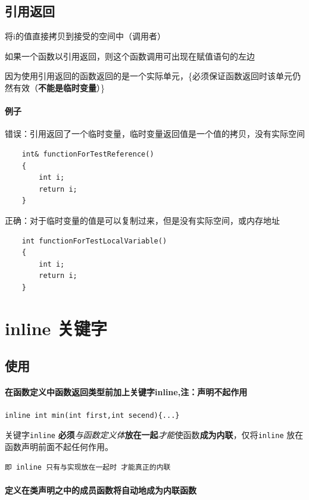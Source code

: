 \documentclass[UTF8,a4paper,12pt]{ctexbook} %
\begin{document}
 	\section{引用返回}将i的值直接拷贝到接受的空间中（调用者）    
 		
	 		如果一个函数以引用返回，则这个函数调用可出现在赋值语句的左边
	 		
	 		因为使用引用返回的函数返回的是一个实际单元，\{必须保证函数返回时该单元仍然有效（\textbf{不能是临时变量}）\}
 		
 		\subsubsection{例子}
 		
	 		错误：引用返回了一个临时变量，临时变量返回值是一个值的拷贝，没有实际空间
	 		\begin{lstlisting}
	int& functionForTestReference()
	{
	 	int i;
		return i;
	}
	 		\end{lstlisting}
	 		
	 		
	 		正确：对于临时变量的值是可以复制过来，但是没有实际空间，或内存地址
		 	\begin{lstlisting}
	int functionForTestLocalVariable()
	{
		int i;
		return i;
	}	 		
		 	\end{lstlisting}
 		
\chapter{inline 关键字} 
 
     \section{使用}
	       \subsubsection{在函数定义中函数返回类型前加上关键字inline,注：声明不起作用} \verb|inline int min(int first,int secend){...}|
       
       关键字\verb|inline| \textbf{必须}\textit{与函数定义体}\textbf{放在一起}\textit{才能}使函数\textbf{成为内联}，仅将\verb|inline| 放在函数声明前面不起任何作用。
       
	   \verb|即 inline 只有与实现放在一起时 才能真正的内联|
	       \subsubsection{定义在类声明之中的成员函数将自动地成为内联函数} 
       
\end{document}
